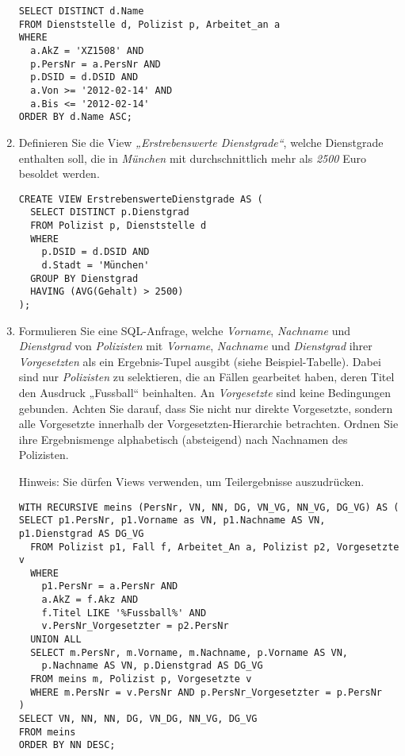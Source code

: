 \documentclass{lehramt-informatik-aufgabe}
\begin{document}
\begin{enumerate}
\begin{antwort}
\begin{verbatim}
SELECT DISTINCT d.Name
FROM Dienststelle d, Polizist p, Arbeitet_an a
WHERE
  a.AkZ = 'XZ1508' AND
  p.PersNr = a.PersNr AND
  p.DSID = d.DSID AND
  a.Von >= '2012-02-14' AND
  a.Bis <= '2012-02-14'
ORDER BY d.Name ASC;
\end{verbatim}
\end{antwort}


\item Definieren Sie die View \emph{„Erstrebenswerte Dienstgrade“},
welche Dienstgrade enthalten soll, die in \emph{München} mit
durchschnittlich mehr als \emph{2500} Euro besoldet werden.

\begin{antwort}
\begin{verbatim}
CREATE VIEW ErstrebenswerteDienstgrade AS (
  SELECT DISTINCT p.Dienstgrad
  FROM Polizist p, Dienststelle d
  WHERE
    p.DSID = d.DSID AND
    d.Stadt = 'München'
  GROUP BY Dienstgrad
  HAVING (AVG(Gehalt) > 2500)
);
\end{verbatim}
\end{antwort}


\item Formulieren Sie eine SQL-Anfrage, welche \emph{Vorname},
\emph{Nachname} und \emph{Dienstgrad} von \emph{Polizisten} mit
\emph{Vorname}, \emph{Nachname} und \emph{Dienstgrad} ihrer
\emph{Vorgesetzten} als ein Ergebnis-Tupel ausgibt (siehe
Beispiel-Tabelle). Dabei sind nur \emph{Polizisten} zu selektieren, die
an Fällen gearbeitet haben, deren Titel den Ausdruck „Fussball“
beinhalten. An \emph{Vorgesetzte} sind keine Bedingungen gebunden.
Achten Sie darauf, dass Sie nicht nur direkte Vorgesetzte, sondern alle
Vorgesetzte innerhalb der Vorgesetzten-Hierarchie betrachten. Ordnen Sie
ihre Ergebnismenge alphabetisch (absteigend) nach Nachnamen des
Polizisten.

Hinweis: Sie dürfen Views verwenden, um Teilergebnisse auszudrücken.

\begin{antwort}

\begin{verbatim}
WITH RECURSIVE meins (PersNr, VN, NN, DG, VN_VG, NN_VG, DG_VG) AS (
SELECT p1.PersNr, p1.Vorname as VN, p1.Nachname AS VN, p1.Dienstgrad AS DG_VG
  FROM Polizist p1, Fall f, Arbeitet_An a, Polizist p2, Vorgesetzte v
  WHERE
    p1.PersNr = a.PersNr AND
    a.AkZ = f.Akz AND
    f.Titel LIKE '%Fussball%' AND
    v.PersNr_Vorgesetzter = p2.PersNr
  UNION ALL
  SELECT m.PersNr, m.Vorname, m.Nachname, p.Vorname AS VN,
    p.Nachname AS VN, p.Dienstgrad AS DG_VG
  FROM meins m, Polizist p, Vorgesetzte v
  WHERE m.PersNr = v.PersNr AND p.PersNr_Vorgesetzter = p.PersNr
)
SELECT VN, NN, NN, DG, VN_DG, NN_VG, DG_VG
FROM meins
ORDER BY NN DESC;
\end{verbatim}
\end{antwort}
\end{enumerate}
\end{document}
